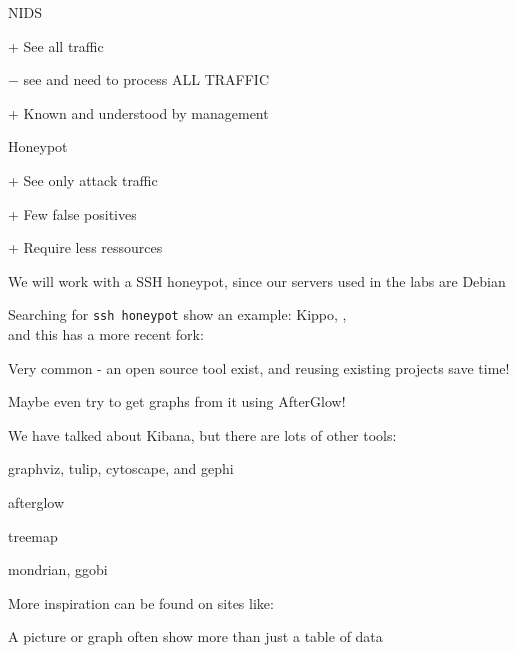 \documentclass[Screen16to9,17pt]{foils}
\begin{document}
\begin{list1}
\item NIDS
\begin{list2}
\item + See all traffic
\item $-$ see and need to process ALL TRAFFIC
\item + Known and understood by management
\end{list2}
\item Honeypot
\begin{list2}
\item + See only attack traffic
\item + Few false positives
\item + Require less ressources
\end{list2}
\end{list1}


We will work with a SSH honeypot, since our servers used in the labs are Debian

Searching for \verb+ssh honeypot+  show an example: Kippo,
,\\
and this has a more recent fork: 

Very common - an open source tool exist, and reusing existing projects save time!

Maybe even try to get graphs from it using AfterGlow!\\




We have talked about Kibana, but there are lots of other tools:

\begin{list2}
\item graphviz, tulip, cytoscape, and gephi
\item afterglow \\
\item treemap
\item mondrian, ggobi
\end{list2}

More inspiration can be found on sites like:

A picture or graph often show more than just a table of data




\slidenext
\end{document}
